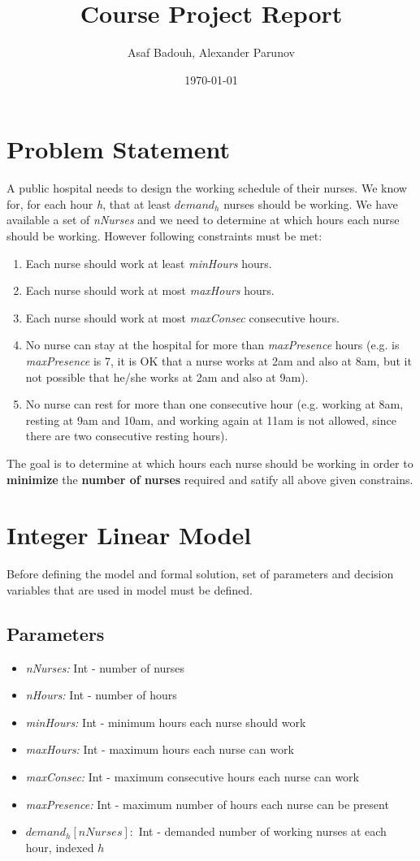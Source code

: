 \documentclass{article}
\author{Asaf Badouh, Alexander Parunov}
\title{Course Project Report}
\date{\today}
\newcommand\tab[1][1cm]{\hspace*{#1}}
\begin{document}
	\maketitle
	\pagebreak
	
	\section{Problem Statement}
\tab A public hospital needs to design the working schedule of their nurses. We know for, for each hour \textit{h}, that at least $demand_h$ nurses should be working. We have available a set of \textit{nNurses} and we need to determine at which hours each nurse should be working. However following constraints must be met:
	\begin{enumerate}
		\item Each nurse should work at least \textit{minHours} hours.
		\item Each nurse should work at most \textit{maxHours} hours.
		\item Each nurse should work at most \textit{maxConsec} consecutive hours.
		\item No nurse can stay at the hospital for more than \textit{maxPresence} hours (e.g. is \textit{maxPresence} is 7, it is OK that a nurse works at 2am and also at 8am, but it not possible that he/she works at 2am and also at 9am).
		\item No nurse can rest for more than one consecutive hour (e.g. working at 8am, resting at 9am and 10am, and working again at 11am is not allowed, since there are two consecutive resting hours).
	\end{enumerate}
\tab The goal is to determine at which hours each nurse should be working in order to \textbf{minimize} the \textbf{number of nurses} required and satify all above given constrains.
	\section{Integer Linear Model}
\tab Before defining the model and formal solution, set of parameters and decision variables that are used in model must be defined.
	\subsection{Parameters}
	\begin{itemize}
		\item \textit{nNurses:} Int - number of nurses
		\item \textit{nHours:} Int - number of hours
		\item \textit{minHours:} Int - minimum hours each nurse should work
		\item \textit{maxHours:} Int - maximum hours each nurse can work
		\item \textit{maxConsec:} Int - maximum consecutive hours each nurse can work
		\item \textit{maxPresence:} Int - maximum number of hours each nurse can be present
		\item $demand_h[nNurses]:$ Int - demanded number of working nurses at each hour, indexed $h$
	\end{itemize}
	
\end{document}
